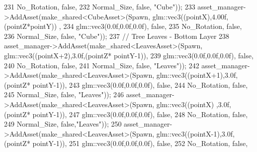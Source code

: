 \begin{DoxyCode}
231                                                            No\_Rotation, \textcolor{keyword}{false},
232                                                            Normal\_Size, \textcolor{keyword}{false}, \textcolor{stringliteral}{"Cube"}));
233             asset\_manager->AddAsset(make\_shared<CubeAsset>(Spawn, glm::vec3((pointX),4.00f,(pointZ*pointY))
      , 
234                                                            glm::vec3(0.0f,0.0f,0.0f), \textcolor{keyword}{false},
235                                                            No\_Rotation, \textcolor{keyword}{false},
236                                                            Normal\_Size, \textcolor{keyword}{false}, \textcolor{stringliteral}{"Cube"}));
237             \textcolor{comment}{// Tree Leaves - Bottom Layer}
238             asset\_manager->AddAsset(make\_shared<LeavesAsset>(Spawn, glm::vec3((pointX+2),3.0f,(pointZ*
      pointY-1)),
239                                                              glm::vec3(0.0f,0.0f,0.0f), \textcolor{keyword}{false},
240                                                              No\_Rotation, \textcolor{keyword}{false},
241                                                              Normal\_Size, \textcolor{keyword}{false}, \textcolor{stringliteral}{"Leaves"}));
242             asset\_manager->AddAsset(make\_shared<LeavesAsset>(Spawn, glm::vec3((pointX+1),3.0f,(pointZ*
      pointY-1)),
243                                                              glm::vec3(0.0f,0.0f,0.0f), \textcolor{keyword}{false},
244                                                              No\_Rotation, \textcolor{keyword}{false},
245                                                              Normal\_Size, \textcolor{keyword}{false}, \textcolor{stringliteral}{"Leaves"}));
246             asset\_manager->AddAsset(make\_shared<LeavesAsset>(Spawn, glm::vec3((pointX)  ,3.0f,(pointZ*
      pointY-1)),
247                                                              glm::vec3(0.0f,0.0f,0.0f), \textcolor{keyword}{false},
248                                                              No\_Rotation, \textcolor{keyword}{false},
249                                                              Normal\_Size, \textcolor{keyword}{false},\textcolor{stringliteral}{"Leaves"}));
250             asset\_manager->AddAsset(make\_shared<LeavesAsset>(Spawn, glm::vec3((pointX-1),3.0f,(pointZ*
      pointY-1)),
251                                                              glm::vec3(0.0f,0.0f,0.0f), \textcolor{keyword}{false},
252                                                              No\_Rotation, \textcolor{keyword}{false},

\end{DoxyCode}
